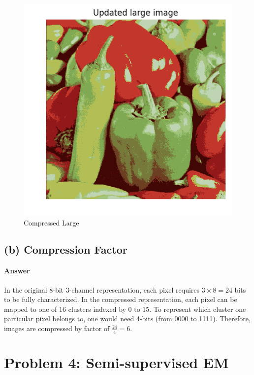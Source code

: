 \documentclass[11pt]{article}
\begin{document}
	\begin{figure}[H]
		\centering
		\includegraphics[width=\linewidth]{src/k_means/updated_large.png}
		\caption{Compressed Large}
	\end{figure}
	
	\newpage
	\subsection{(b) Compression Factor}
	\paragraph{Answer} In the original 8-bit 3-channel representation, each pixel requires $3 \times 8 = 24$ bits to be fully characterized. In the compressed representation, each pixel can be mapped to one of 16 clusters indexed by 0 to 15. To represent which cluster one particular pixel belongs to, one would need 4-bits (from 0000 to 1111). Therefore, images are compressed by factor of $\frac{24}{4} = 6$.
	
	\newpage
	\section{Problem 4: Semi-supervised EM}
\end{document}
